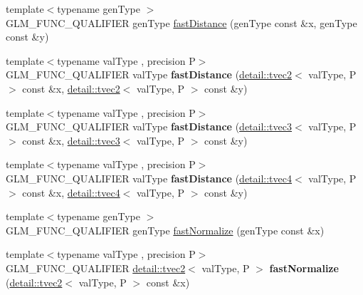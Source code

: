 \begin{DoxyCompactItemize}
\item 
{\footnotesize template$<$typename gen\+Type $>$ }\\G\+L\+M\+\_\+\+F\+U\+N\+C\+\_\+\+Q\+U\+A\+L\+I\+F\+I\+ER gen\+Type \hyperlink{group__gtx__fast__square__root_ga69778792fcadc29f586efa3ec2118cdc}{fast\+Distance} (gen\+Type const \&x, gen\+Type const \&y)
\item 
{\footnotesize template$<$typename val\+Type , precision P$>$ }\\G\+L\+M\+\_\+\+F\+U\+N\+C\+\_\+\+Q\+U\+A\+L\+I\+F\+I\+ER val\+Type {\bfseries fast\+Distance} (\hyperlink{structglm_1_1detail_1_1tvec2}{detail\+::tvec2}$<$ val\+Type, P $>$ const \&x, \hyperlink{structglm_1_1detail_1_1tvec2}{detail\+::tvec2}$<$ val\+Type, P $>$ const \&y)\hypertarget{namespaceglm_abad0f73feba7bba2a34268ea6464ef92}{}\label{namespaceglm_abad0f73feba7bba2a34268ea6464ef92}

\item 
{\footnotesize template$<$typename val\+Type , precision P$>$ }\\G\+L\+M\+\_\+\+F\+U\+N\+C\+\_\+\+Q\+U\+A\+L\+I\+F\+I\+ER val\+Type {\bfseries fast\+Distance} (\hyperlink{structglm_1_1detail_1_1tvec3}{detail\+::tvec3}$<$ val\+Type, P $>$ const \&x, \hyperlink{structglm_1_1detail_1_1tvec3}{detail\+::tvec3}$<$ val\+Type, P $>$ const \&y)\hypertarget{namespaceglm_ae821b1d9d6994f4991f8ebeafb762282}{}\label{namespaceglm_ae821b1d9d6994f4991f8ebeafb762282}

\item 
{\footnotesize template$<$typename val\+Type , precision P$>$ }\\G\+L\+M\+\_\+\+F\+U\+N\+C\+\_\+\+Q\+U\+A\+L\+I\+F\+I\+ER val\+Type {\bfseries fast\+Distance} (\hyperlink{structglm_1_1detail_1_1tvec4}{detail\+::tvec4}$<$ val\+Type, P $>$ const \&x, \hyperlink{structglm_1_1detail_1_1tvec4}{detail\+::tvec4}$<$ val\+Type, P $>$ const \&y)\hypertarget{namespaceglm_a8aa811e84bd1f8d69f4ff2185ec4e4f2}{}\label{namespaceglm_a8aa811e84bd1f8d69f4ff2185ec4e4f2}

\item 
{\footnotesize template$<$typename gen\+Type $>$ }\\G\+L\+M\+\_\+\+F\+U\+N\+C\+\_\+\+Q\+U\+A\+L\+I\+F\+I\+ER gen\+Type \hyperlink{group__gtx__fast__square__root_ga3b02c1d6e0c754144e2f1e110bf9f16c}{fast\+Normalize} (gen\+Type const \&x)
\item 
{\footnotesize template$<$typename val\+Type , precision P$>$ }\\G\+L\+M\+\_\+\+F\+U\+N\+C\+\_\+\+Q\+U\+A\+L\+I\+F\+I\+ER \hyperlink{structglm_1_1detail_1_1tvec2}{detail\+::tvec2}$<$ val\+Type, P $>$ {\bfseries fast\+Normalize} (\hyperlink{structglm_1_1detail_1_1tvec2}{detail\+::tvec2}$<$ val\+Type, P $>$ const \&x)\hypertarget{namespaceglm_a5a77e7b85b5e1625b045f168c4c8a68e}{}\label{namespaceglm_a5a77e7b85b5e1625b045f168c4c8a68e}


\end{DoxyCompactItemize}
